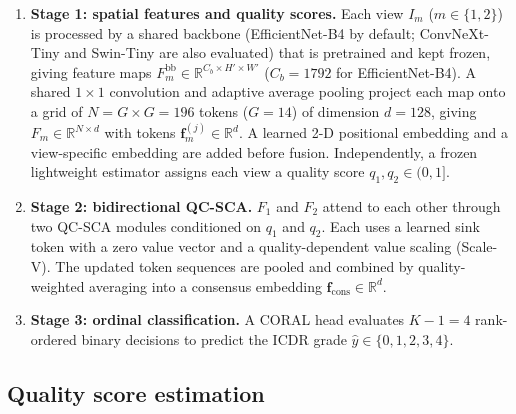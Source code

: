 \documentclass[final,5p,times,twocolumn,authoryear]{elsarticle}
\newcommand{\qcsca}{QC-SCA}
\theoremstyle{plain}
\theoremstyle{remark}
\begin{document}
\begin{enumerate}
  \item \textbf{Stage 1: spatial features and quality scores.} Each view $I_m$ ($m \in \{1, 2\}$) is processed by a shared backbone (EfficientNet-B4 \citep{Tan2019efficientnet} by default; ConvNeXt-Tiny \citep{Liu2022convnext} and Swin-Tiny \citep{Liu2021swin} are also evaluated) that is pretrained and kept frozen, giving feature maps $F_m^{\text{bb}} \in \mathbb{R}^{C_b \times H' \times W'}$ ($C_b = 1792$ for EfficientNet-B4). A shared $1{\times}1$ convolution and adaptive average pooling project each map onto a grid of $N = G \times G = 196$ tokens ($G = 14$) of dimension $d = 128$, giving $F_m \in \mathbb{R}^{N \times d}$ with tokens $\mathbf{f}_m^{(j)} \in \mathbb{R}^d$. A learned 2-D positional embedding and a view-specific embedding are added before fusion. Independently, a frozen lightweight estimator assigns each view a quality score $q_1, q_2 \in (0, 1]$.
  \item \textbf{Stage 2: bidirectional QC-SCA.} $F_1$ and $F_2$ attend to each other through two \qcsca{} modules conditioned on $q_1$ and $q_2$. Each uses a learned sink token with a zero value vector and a quality-dependent value scaling (Scale-V). The updated token sequences are pooled and combined by quality-weighted averaging into a consensus embedding $\mathbf{f}_{\text{cons}} \in \mathbb{R}^{d}$.
  \item \textbf{Stage 3: ordinal classification.} A CORAL head \citep{Cao2020coral} evaluates $K-1=4$ rank-ordered binary decisions to predict the ICDR grade $\hat{y} \in \{0, 1, 2, 3, 4\}$.
\end{enumerate}

\subsection{Quality score estimation}
\label{sec:qest}
\end{document}
